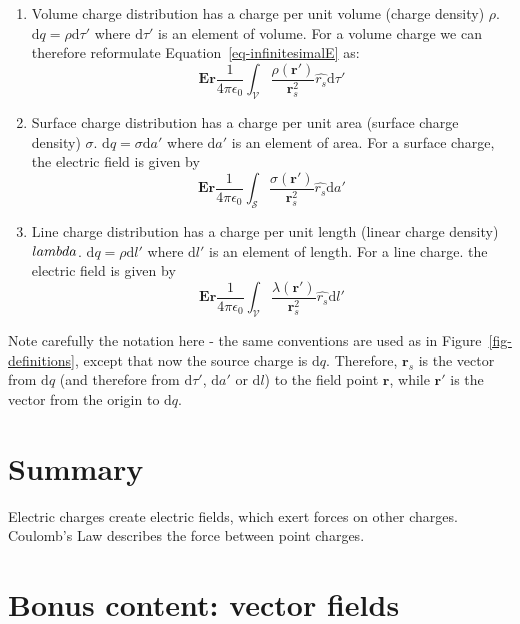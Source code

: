 \documentclass[
  letterpaper,
  DIV=11,
  numbers=noendperiod]{scrreprt}
\begin{document}
\begin{enumerate}
\def\labelenumi{\arabic{enumi})}
\item
  Volume charge distribution has a charge per unit volume (charge
  density) \(\rho\). \(\mathrm{d}q = \rho \mathrm{d}\tau'\) where
  \(\mathrm{d}\tau'\) is an element of volume. For a volume charge we
  can therefore reformulate Equation~\ref{eq-infinitesimalE} as:
  \[ \mathrm{\mathbf{E}}{\mathrm{\mathbf{r}}} \frac{1}{4\pi\epsilon_0} \int_{\mathcal{V}} \frac{\rho (\mathrm{\mathbf{r}}')}{\mathrm{\mathbf{r}}_s^2} \hat{r_s} \mathrm{d}\tau' \]
\item
  Surface charge distribution has a charge per unit area (surface charge
  density) \(\sigma\). \(\mathrm{d}q = \sigma \mathrm{d}a'\) where
  \(\mathrm{d}a'\) is an element of area. For a surface charge, the
  electric field is given by
  \[ \mathrm{\mathbf{E}}{\mathrm{\mathbf{r}}} \frac{1}{4\pi\epsilon_0} \int_{\mathcal{S}} \frac{\sigma (\mathrm{\mathbf{r}}')}{\mathrm{\mathbf{r}}_s^2} \hat{r_s} \mathrm{d}a' \]
\item
  Line charge distribution has a charge per unit length (linear charge
  density) \(\\lambda\). \(\mathrm{d}q = \rho \mathrm{d}l'\) where
  \(\mathrm{d}l'\) is an element of length. For a line charge. the
  electric field is given by
  \[ \mathrm{\mathbf{E}}{\mathrm{\mathbf{r}}} \frac{1}{4\pi\epsilon_0} \int_{\mathcal{V}} \frac{\lambda (\mathrm{\mathbf{r}}')}{\mathrm{\mathbf{r}}_s^2} \hat{r_s} \mathrm{d}l' \]
\end{enumerate}

Note carefully the notation here - the same conventions are used as in
Figure~\ref{fig-definitions}, except that now the source charge is
\(\mathrm{d}q\). Therefore, \(\mathrm{\mathbf{r}}_s\) is the vector from
\(\mathrm{d}q\) (and therefore from \(\mathrm{d}\tau'\),
\(\mathrm{d}a'\) or \(\mathrm{d}l\)) to the field point
\(\mathrm{\mathbf{r}}\), while \(\mathrm{\mathbf{r}}'\) is the vector
from the origin to \(\mathrm{d}q\).

\section{Summary}\label{summary}

Electric charges create electric fields, which exert forces on other
charges. Coulomb's Law describes the force between point charges.

\section{Bonus content: vector
fields}\label{bonus-content-vector-fields}
\end{document}
